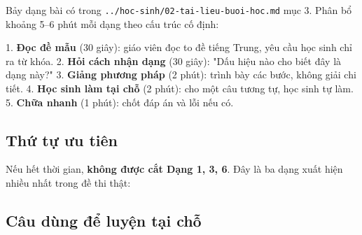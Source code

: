 \documentclass[11pt, a4paper]{article}
\begin{document}
Bảy dạng bài có trong \texttt{../hoc-sinh/02-tai-lieu-buoi-hoc.md} mục 3. Phân bổ khoảng 5–6 phút mỗi dạng theo cấu trúc cố định:

1. \textbf{Đọc đề mẫu} (30 giây): giáo viên đọc to đề tiếng Trung, yêu cầu học sinh chỉ ra từ khóa.
2. \textbf{Hỏi cách nhận dạng} (30 giây): "Dấu hiệu nào cho biết đây là dạng này?"
3. \textbf{Giảng phương pháp} (2 phút): trình bày các bước, không giải chi tiết.
4. \textbf{Học sinh làm tại chỗ} (2 phút): cho một câu tương tự, học sinh tự làm.
5. \textbf{Chữa nhanh} (1 phút): chốt đáp án và lỗi nếu có.

\subsection{Thứ tự ưu tiên}

Nếu hết thời gian, \textbf{không được cắt Dạng 1, 3, 6}. Đây là ba dạng xuất hiện nhiều nhất trong đề thi thật:


\subsection{Câu dùng để luyện tại chỗ}
\end{document}
